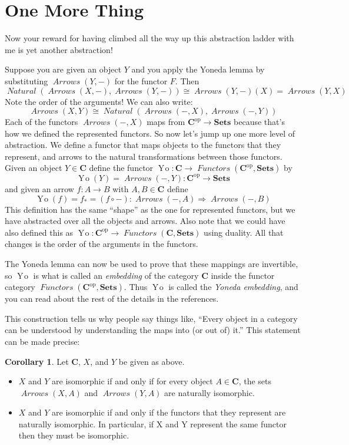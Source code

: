 \documentclass[12pt]{article}
\theoremstyle{definition}
\newtheorem{cor}[thm]{Corollary}
\theoremstyle{definition}
\theoremstyle{definition}
\numberwithin{equation}{section}
\newcommand{\op}{\mathrm{op}}           %
\newcommand{\cat}[1]{\mathbf{#1}}      %
\newcommand{\fcat}[1]{{\mathbf {#1}}}    %
\newcommand{\CC}{\cat{C}}
\DeclareMathOperator{\Arrows}{\mathit{Arrows}}
\DeclareMathOperator{\Nat}{\mathit{Natural}}
\DeclareMathOperator{\Fun}{\mathit{Functors}}
\newcommand{\Set}{\fcat{Sets}}           %
\newcommand{\iso}{\cong}                %
\newcommand{\yo}{\mathop{Y\!o}}
\newcommand{\fto}{\Rightarrow}
\begin{document}
\section{One More Thing}

Now your reward for having climbed all the way up this abstraction ladder with me is yet
another abstraction!

Suppose you are given an object $Y$ and you apply the Yoneda lemma by substituting
$\Arrows(Y,-)$ for the functor $F$. Then
$$
\Nat(\Arrows(X, -),\Arrows(Y,-)) \iso \Arrows(Y,-)(X) = \Arrows(Y,X)
$$
Note the order of the arguments! We can also write:
$$
\Arrows(X,Y) \iso \Nat(\Arrows(-, X),\Arrows(-,Y))
$$
Each of the functors $\Arrows(-, X)$ maps from $\CC^\op \to \Set$ because that's how we
defined the represented functors. So now let's jump up one more level of abstraction. We
define a functor that maps objects to the functors that they represent, and arrows to the
natural transformations between those functors. Given an object $Y\in\CC$ define the functor
$\yo:\CC \to \Fun(\CC^\op, \Set)$ by
$$
\yo(Y) = \Arrows(-, Y) : \CC^\op \to \Set
$$
and given an arrow $f: A \to B$ with $A,B \in \CC$ define
$$
\yo(f) = f_* = (f \circ -) : \Arrows(-,A) \fto \Arrows(-,B)
$$
This definition has the same ``shape'' as the one for represented functors, but we have
abstracted over all the objects and arrows. Also note that we could have also defined this
as $\yo:\CC^\op \to \Fun(\CC, \Set)$ using duality. All that changes is the 
order of the arguments in the functors.

The Yoneda lemma can now be used to prove that these mappings are invertible, so
$\yo$ is what is called an {\it embedding} of the category $\CC$ inside the functor
category $\Fun(\CC^\op, \Set)$. Thus $\yo$ is called the {\it Yoneda embedding}, and you
can read about the rest of the details in the references.

This construction tells us why people say things like, ``Every object in a category can be
understood by understanding the maps into (or out of) it.''  This statement can be made precise:
\begin{cor}
Let $\CC$, $X$, and $Y$ be given as above.
\begin{itemize}
\item $X$  and $Y$ are isomorphic if and only if for every object $A \in \CC$, the sets
$\Arrows(X, A)$ and $\Arrows(Y, A)$ are naturally isomorphic.
\item $X$ and $Y$ are isomorphic if and only if the functors that they represent are
naturally isomorphic. In particular, if X and Y represent the same functor then they must
be isomorphic.
\end{itemize}
\end{cor}
\end{document}
